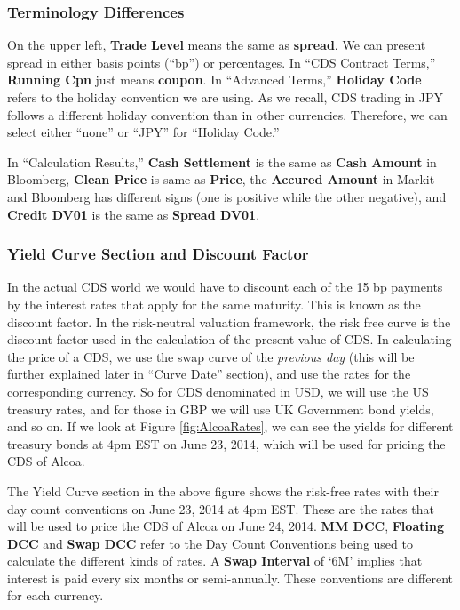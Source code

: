 \documentclass{jss}
\begin{document}
\subsubsection{Terminology Differences}
On the upper left, \textbf{Trade Level} means the same as \textbf{spread}. We can present spread in either basis points (``bp'') or percentages. In ``CDS Contract Terms,'' \textbf{Running Cpn} just means \textbf{coupon}. In ``Advanced Terms,'' \textbf{Holiday Code} refers to the holiday convention we are using. As we recall, CDS trading in JPY follows a different holiday convention than in other currencies. Therefore, we can select either ``none'' or ``JPY'' for ``Holiday Code.''

In ``Calculation Results,'' \textbf{Cash Settlement} is the same as \textbf{Cash Amount} in Bloomberg, \textbf{Clean Price} is same as \textbf{Price}, the \textbf{Accured Amount} in Markit and Bloomberg has different signs (one is positive while the other negative), and \textbf{Credit DV01} is the same as \textbf{Spread DV01}.

\subsubsection{Yield Curve Section and Discount Factor}

In the actual CDS world we would have to discount each of the 15 bp payments by the interest rates that apply for the same maturity. This is known as the discount factor. In the risk-neutral valuation framework, the risk free curve is the discount factor used in the calculation of the present value of CDS. In calculating the price of a CDS, we use the swap curve of the \textit{previous day} (this will be further explained later in ``Curve Date'' section), and use the rates for the corresponding currency. So for CDS denominated in USD, we will use the US treasury rates, and for those in GBP we will use UK Government bond yields, and so on. If we look at Figure \ref{fig:AlcoaRates}, we can see the yields for different treasury bonds at 4pm EST on June 23, 2014, which will be used for pricing the CDS of Alcoa.

The Yield Curve section in the above figure shows the risk-free rates with their day count conventions on June 23, 2014 at 4pm EST. These are the rates that will be used to price the CDS of Alcoa on June 24, 2014. \textbf{MM DCC}, \textbf{Floating DCC} and \textbf{Swap DCC} refer to the Day Count Conventions being used to calculate the different kinds of rates. A \textbf{Swap Interval} of `6M' implies that interest is paid every six months or semi-annually. These conventions are different for each currency.
\end{document}
